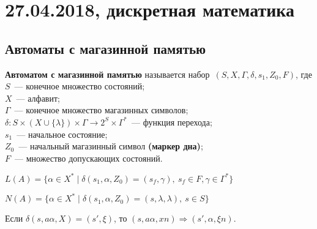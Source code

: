 \chapter{27.04.2018, дискретная математика}
\section{Автоматы с магазинной памятью}
\textbf{Автоматом с магазинной памятью} называется набор~$(S, X, \Gamma, \delta, s_1, Z_0, F)$, где\\
$S$~--- конечное множество состояний;\\
$X$~--- алфавит;\\
$\Gamma$~--- конечное множество магазинных символов;\\
$\delta \colon S \times (X \cup \{ \lambda \}) \times \Gamma \to 2^S \times \Gamma^*$~--- функция перехода;\\
$s_1$~--- начальное состояние;\\
$Z_0$~--- начальный магазинный символ \textbf{(маркер дна)};\\
$F$~--- множество допускающих состояний.

$L(A) = \{ \alpha \in X^* \mid \delta(s_1, \alpha, Z_0) = (s_f, \gamma), \ s_f \in F, \gamma \in \Gamma^* \}$

$N(A) = \{ \alpha \in X^* \mid \delta(s_1, \alpha, Z_0) = (s, \lambda, \lambda), \ s \in S \}$

Если $\delta(s, a \alpha, X) = (s', \xi)$, то $(s, a \alpha, x n) \Rightarrow (s', \alpha, \xi n)$.